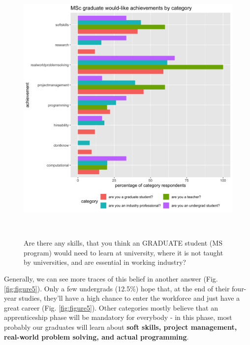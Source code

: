 \documentclass{sigchi}
\begin{document}
\begin{figure}
 \includegraphics[scale=0.2]{../data-analysis/plots_output/MSc_graduate_would-like_achievements_by_category.png}
  \caption{Are there any skills, that you think an GRADUATE student (MS program) would need to learn at university, where it is not taught by universities, and are essential in working industry?}~\label{fig:figure4}
\end{figure}

Generally, we can see more traces of this belief in another answer (Fig. \ref{fig:figure5}). Only a few undergrads (12.5\%) hope that, at the end of their four-year studies, they'll have a high chance to enter the workforce and just have a great career (Fig. \ref{fig:figure5}). Other categories mostly believe that an apprenticeship phase will be mandatory for everybody - in this phase, most probably our graduates will learn about \textbf{soft skills, project management, real-world problem solving, and actual programming}.
\end{document}
